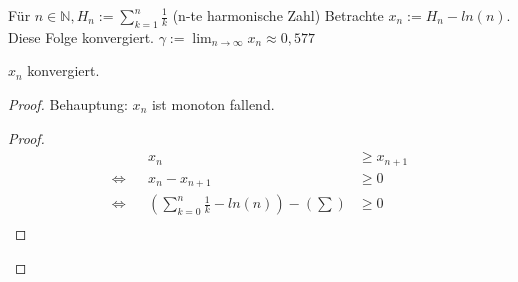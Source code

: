 \documentclass[12pt]{article}
\newcommand{\comment}[1]{}
\begin{document}
Für \(n\in\mathbb{N}, H_n := \sum_{k=1}^n \frac{1}{k}\)  (n-te harmonische Zahl)
Betrachte \(x_n := H_n - ln(n)\). Diese Folge konvergiert. \(\gamma  := \lim_{n\to\infty} x_n \approx 0,577\)
\comment{
\begin{theorem}
\(x_n\) konvergiert.
\end{theorem}
\begin{proof}
\begin{align*}
x_n - x_{n-1} &= H_n - ln(n) - H_{n-1} + ln(n-1) \\
&= H_n - ln(n) - H_{n-1} + ln(n-1) \\
&= H_n - H_{n-1} - (ln(n) - ln(n-1)) \\
&= \sum_{k=1}^n \frac{1}{k} - \sum_{k=1}^{n-1} \frac{1}{k} - (ln(n) - ln(n-1)) \\
&= \frac{1}{n} - \underbrace{(ln(n) - ln(n-1))}_{\to 0\text{, da \(ln'(x) \to 0\) gilt}} \\
\end{align*}
\end{proof}
}

\begin{theorem}
\(x_n\) konvergiert.
\end{theorem}
\begin{proof}
Behauptung: \(x_n\) ist monoton fallend.
\begin{proof}
\begin{align*}
&& x_n &\geq x_{n+1} \\
\iff && x_n - x_{n+1} &\geq 0 \\
\iff && \left(\sum_{k=0}^n \frac{1}{k} - ln(n)\right) - \left(\sum\right) &\geq 0 \\
\end{align*} %
\end{proof}
\end{proof}
\end{document}
